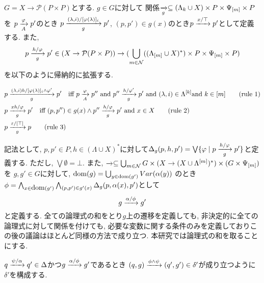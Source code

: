 \documentclass[uplatex,dvipdfmx,a4j]{jsreport}
\begin{document}
  $G = X \rightarrow \mathcal{P}(P \times P)$とする.
  $g \in G$に対して
  関係$\transarrow{}{g} \subseteq (\Lambda_{k} \cup X) \times P \times \Psi_{[m]} \times P$を
  $p \transarrow{\varphi}{A} p'$のとき
  $p \transarrow{(\lambda, i) / [\varphi(\lambda)]_i}{g} p'$,
  $(p, p') \in g(x)$のとき$p \transarrow{x / \top}{} p'$として定義する.
  また,
  \[
    p \transarrow{h / \varphi}{g} p' \in (X \rightarrow \mathcal{P}(P \times P))
      \rightarrow (\bigcup_{m \in \mathcal{N}}
      ((\Lambda_{[m]} \cup X)^*) \times P \times \Psi_{[m]} \times P)
  \]
  を以下のように帰納的に拡張する.

  \setcounter{equation}{0}
  \begin{align}
    p &\transarrow{
      (\lambda, i) h / [\varphi(\lambda)]_i \land \varphi'
    }{g} p' \quad
      \mbox{iff} \
        p \transarrow{\varphi}{A} p'' \
      \mbox{and} \
        p'' \transarrow{h / \varphi'}{g} p' \
      \mbox{and} \
        (\lambda, i) \in \Lambda^{[k]}
      \mbox{and} \
        k \in [m]   \tag{\mbox{rule 1}} \label{rule: 1} \\
    p &\transarrow{x h / \varphi}{g} p' \quad
      \mbox{iff} \
        (p, p'') \in g(x) \land p'' \transarrow{h / \varphi}{g} p' \
      \mbox{and} \
        x \in X \tag{\mbox{rule 2}} \label{rule: 2} \\
    p &\transarrow{\varepsilon / [\top]}{g} p \tag{\mbox{rule 3}} \label{rule: 3}
  \end{align}

  記法として, $p, p' \in P, h \in (\Lambda \cup X)^*$に対して$\Delta_g(p, h, p') = \bigvee \{
    \varphi \mid p \transarrow{h / \varphi}{g} p'
  \}$と定義する. ただし, $\bigvee \emptyset = \bot$.
  また, $\transarrow{}{} \subseteq \bigcup_{m \in \mathcal{N}} G \times
    (X \rightarrow (X \cup \Lambda^{[m]})^*) \times (G \times \Psi_{[m]})$を
  $g, g' \in G$に対して,
  $\dom(g) = \bigcup_{y \in \scriptsize \dom(g')} Var(\alpha(y))$
  のとき
  $\phi =
    \bigwedge_{x \in \dom(g')} \bigwedge_{(p, p') \in g'(x)}
      \Delta_g(p, \alpha(x), p')
  $として
  \[
    g \transarrow{\alpha / \phi}{} g'
  \]
  と定義する.
  全ての論理式の和をとり$g$上の遷移を定義しても, 非決定的に全ての論理式に対して関係を付けても,
  必要な変数に関する条件のみを定義しておりこの後の議論はほとんど同様の方法で成り立つ. 本研究では論理式の和を取ることにする.

  $q \transarrow{\psi / \alpha}{} q' \in \Delta$かつ$g \transarrow{\alpha / \phi}{} g'$であるとき
  $(q, g) \transarrow{\phi \land \psi}{} (q', g') \in \delta'$が成り立つように$\delta'$を構成する.
\end{document}
